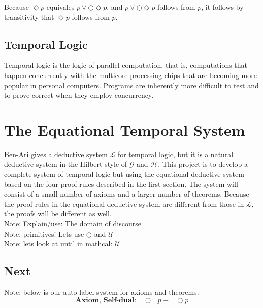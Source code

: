 \documentclass[fleqn, leqno]{article}
\newcommand{\Next}{\bigcirc}
\newcommand{\Event}{\Diamond}
\begin{document}
Because $\Event p$ equivales $p \lor \Next\Event p$, and $p \lor \Next\Event p$ follows from $p$, it follows by
transitivity that $\Event p$ follows from $p$. 

\subsection{Temporal Logic}

Temporal logic is the logic of parallel computation, that is, computations that happen concurrently
with the multicore processing chips that are becoming more popular in personal computers.
Programs are inherently more difficult to test and to prove correct when they employ concurrency.\\


\section{The Equational Temporal System}

Ben-Ari \cite{Ben} gives a deductive system $\mathcal{L}$ for temporal logic, but it is a
natural deductive system in the Hilbert style of $\mathcal{G}$ and $\mathcal{H}$. This project is to develop a complete system of
temporal logic but using the equational deductive system based on the four proof rules described
in the first section. The system will consist of a small number of axioms and a larger number of
theorems. Because the proof rules in the equational deductive system are different from those
in $\mathcal{L}$, the proofs will be different as well.\\

Note: Explain/use: The domain of discourse\\

Note: primitives!  Lets use $\Next$ and $\mathcal{U}$\\

Note: lets look at until in mathcal: $\mathcal{U}$\\



\subsection{Next}

Note: below is our auto-label system for axioms and theorems.\\

\begin{equation}\label{E:selfDual}
\textbf{Axiom, Self-dual:}\quad \Next\lnot p \equiv \lnot\Next p
\end{equation}
\end{document}
